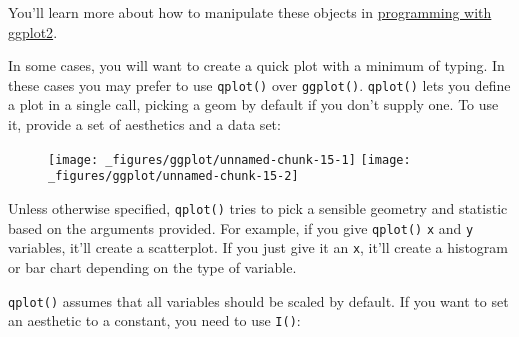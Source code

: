 You'll learn more about how to manipulate these objects in
\hyperref[cha:programming]{programming with ggplot2}.


In some cases, you will want to create a quick plot with a minimum of
typing. In these cases you may prefer to use \texttt{qplot()} over
\texttt{ggplot()}. \texttt{qplot()} lets you define a plot in a single
call, picking a geom by default if you don't supply one. To use it,
provide a set of aesthetics and a data set: 

\begin{Shaded}
\begin{Highlighting}[]
 
 
\end{Highlighting}
\end{Shaded}

\begin{figure}[H]
  \texttt{[image: \_figures/ggplot/unnamed-chunk-15-1]}%
  \texttt{[image: \_figures/ggplot/unnamed-chunk-15-2]}
\end{figure}

Unless otherwise specified, \texttt{qplot()} tries to pick a sensible
geometry and statistic based on the arguments provided. For example, if
you give \texttt{qplot()} \texttt{x} and \texttt{y} variables, it'll
create a scatterplot. If you just give it an \texttt{x}, it'll create a
histogram or bar chart depending on the type of variable.

\texttt{qplot()} assumes that all variables should be scaled by default.
If you want to set an aesthetic to a constant, you need to use
\texttt{I()}: 

\begin{Shaded}
\begin{Highlighting}[]
  \NormalTok{)}
  \NormalTok{(}\NormalTok{))}
\end{Highlighting}
\end{Shaded}

